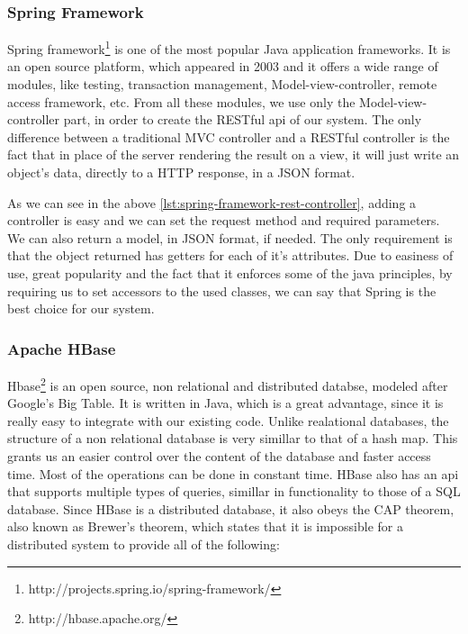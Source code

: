 \subsubsection{Spring Framework}
\label{sec:frameworks-spring-framework}
Spring framework\footnote{http://projects.spring.io/spring-framework/} is one of the most popular Java application frameworks. It is an open source platform, which appeared in 2003 and it offers a wide range of modules, like testing, transaction management, Model-view-controller, remote access framework, etc. 
From all these modules, we use only the Model-view-controller part, in order to create the RESTful api of our system.
The only difference between a traditional MVC controller and a RESTful controller is the fact that in place of the server rendering the result on a view, it will just write an object's data, directly to a HTTP response, in a JSON format.
\lstset{caption=Spring framework REST controller code, label=lst:spring-framework-rest-controller}

As we can see in the above \autoref{lst:spring-framework-rest-controller}, adding a controller is easy and we can set the request method and required parameters.
We can also return a model, in JSON format, if needed. The only requirement is that the object returned has getters for each of it's attributes.
Due to easiness of use, great popularity and the fact that it enforces some of the java principles, by requiring us to set accessors to the used classes, we can say that Spring is the best choice for our system. 

\subsubsection{Apache HBase}
\label{sec:frameworks-hbase}
Hbase\footnote{http://hbase.apache.org/} is an open source, non relational and distributed databse, modeled after Google's Big Table. It is written in Java, which is a great advantage, since it is really easy to integrate with our existing code.
Unlike realational databases, the structure of a non relational database is very simillar to that of a hash map. This grants us an easier control over the content of the database and faster access time. Most of the operations can be done in constant time. HBase also has an api that supports multiple types of queries, simillar in functionality to those of a SQL database.
Since HBase is a distributed database, it also obeys the CAP theorem, also known as Brewer's theorem, which states that it is impossible for a distributed system to provide all of the following:

